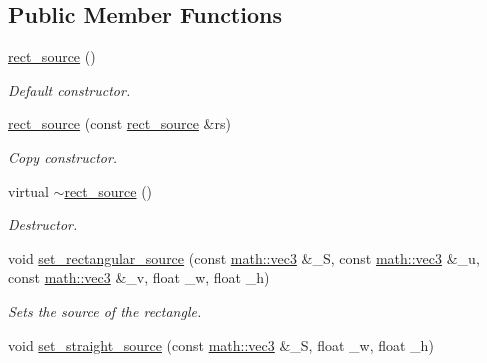 \subsection*{Public Member Functions}
\begin{DoxyCompactItemize}
\item 
\mbox{\label{classphysim_1_1init_1_1rect__source_acf710adbf563be896e4f5d664c679366}} 
\hyperlink{classphysim_1_1init_1_1rect__source_acf710adbf563be896e4f5d664c679366}{rect\+\_\+source} ()
\begin{DoxyCompactList}\small\item\em Default constructor. \end{DoxyCompactList}\item 
\hyperlink{classphysim_1_1init_1_1rect__source_a0a8b0a776a1aba007a620ce7bd5033dc}{rect\+\_\+source} (const \hyperlink{classphysim_1_1init_1_1rect__source}{rect\+\_\+source} \&rs)
\begin{DoxyCompactList}\small\item\em Copy constructor. \end{DoxyCompactList}\item 
\mbox{\label{classphysim_1_1init_1_1rect__source_af3cb48e7b32f013808bdb9792e7e8bac}} 
virtual \hyperlink{classphysim_1_1init_1_1rect__source_af3cb48e7b32f013808bdb9792e7e8bac}{$\sim$rect\+\_\+source} ()
\begin{DoxyCompactList}\small\item\em Destructor. \end{DoxyCompactList}\item 
void \hyperlink{classphysim_1_1init_1_1rect__source_a6f398085d0f0391b2acf91cebd5b97c1}{set\+\_\+rectangular\+\_\+source} (const \hyperlink{structphysim_1_1math_1_1vec3}{math\+::vec3} \&\+\_\+S, const \hyperlink{structphysim_1_1math_1_1vec3}{math\+::vec3} \&\+\_\+u, const \hyperlink{structphysim_1_1math_1_1vec3}{math\+::vec3} \&\+\_\+v, float \+\_\+w, float \+\_\+h)
\begin{DoxyCompactList}\small\item\em Sets the source of the rectangle. \end{DoxyCompactList}\item 
void \hyperlink{classphysim_1_1init_1_1rect__source_aa76e350cf969a5f7e264fc6318d91be5}{set\+\_\+straight\+\_\+source} (const \hyperlink{structphysim_1_1math_1_1vec3}{math\+::vec3} \&\+\_\+S, float \+\_\+w, float \+\_\+h)

\end{DoxyCompactItemize}
